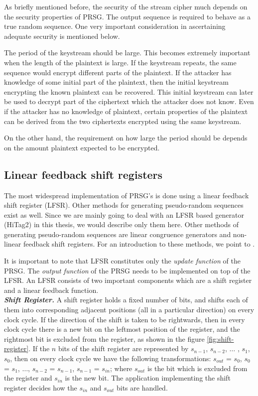 As briefly mentioned before, the security of the stream cipher much depends on the security properties of PRSG. The output sequence is required to behave as a true random sequence. One very important consideration in ascertaining adequate security \cite{robshaw1995sct} is mentioned below.

The period of the keystream should be large. This becomes extremely important when the length of the plaintext is large. If the keystream repeats, the same sequence would encrypt different parts of the plaintext. If the attacker has knowledge of some initial part of the plaintext, then the initial keystream encrypting the known plaintext can be recovered. This initial keystream can later be used to decrypt part of the ciphertext which the attacker does not know. Even if the attacker has no knowledge of plaintext, certain properties of the plaintext can be derived from the two ciphertexts encrypted using the same keystream. 

On the other hand, the requirement on how large the period should be depends on the amount plaintext expected to be encrypted.

\subsection{Linear feedback shift registers} 
\label{sec:lfsr}
The most widespread implementation of PRSG's is done using a linear feedback shift register (LFSR). Other methods for generating pseudo-random sequences exist as well. Since we are mainly going to deal with an LFSR based generator (HiTag2) in this thesis, we would describe only them here. Other methods of generating pseudo-random sequences are linear congruence generators and non-linear feedback shift registers. For an introduction to these methods, we point to \cite{zeng1991pbg}. 

It is important to note that LFSR constitutes only the \emph{update function} of the PRSG. The \emph{output function} of the PRSG needs to be implemented on top of the LFSR. An LFSR consists of two important components which are a shift register and a linear feedback function.\\

\textbf{\emph{Shift Register.}} A shift register holds a fixed number of bits, and shifts each of them into corresponding adjacent positions (all in a particular direction) on every clock cycle. If the direction of the shift is taken to be rightwards, then in every clock cycle there is a new bit on the leftmost position of the register, and the rightmost bit is excluded from the register, as shown in the figure \ref{fig:shift-register}. If the $n$ bits of the shift register are represented by $s_{n-1}$, $s_{n-2}$, $\ldots$ , $s_{1}$, $s_{0}$, then on every clock cycle we have the following transformations: $s_{out}$ = $s_{0}$, $s_{0}$ = $s_{1}$, $\ldots$, $s_{n-2}$ = $s_{n-1}$, $s_{n-1}$ = $s_{in}$; where $s_{out}$ is the bit which is excluded from the register and $s_{in}$ is the new bit. The application implementing the shift register decides how the $s_{in}$ and $s_{out}$ bits are handled.

